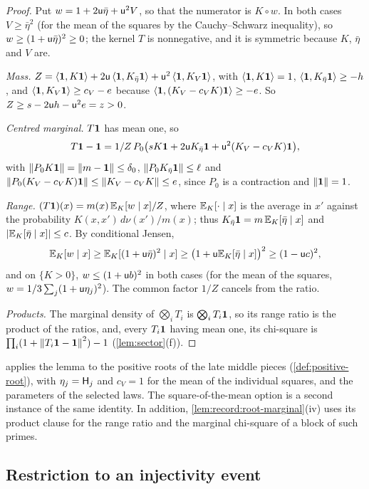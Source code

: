 \begin{proof}
Put $w=1+2\mathsf u\bar\eta+\mathsf u^2V$, so that the numerator is $K\circ w$. In both
cases $V\ge\bar\eta^2$ (for the mean of the squares by the Cauchy--Schwarz
inequality), so $w\ge(1+\mathsf u\bar\eta)^2\ge0$; the kernel $T$ is nonnegative,
and it is symmetric because $K$, $\bar\eta$ and $V$ are.

\emph{Mass.} $Z=\left\langle \mathbf 1,K\mathbf 1\right\rangle+2\mathsf u\left\langle \mathbf 1,K_{\bar\eta}\mathbf 1\right\rangle
+\mathsf u^2\left\langle \mathbf 1,K_V\mathbf 1\right\rangle$, with $\left\langle \mathbf 1,K\mathbf 1\right\rangle=1$,
$\left\langle \mathbf 1,K_{\bar\eta}\mathbf 1\right\rangle\ge-h$, and $\left\langle \mathbf 1,K_V\mathbf 1\right\rangle\ge c_V-e$ because
$\left\langle \mathbf 1,(K_V-c_VK)\mathbf 1\right\rangle\ge-e$. So $Z\ge s-2\mathsf u h-\mathsf u^2e=z>0$.

\emph{Centred marginal.} $T\mathbf 1$ has mean one, so
\[
  T\mathbf 1-\mathbf 1=1/Z\,P_0\big(sK\mathbf 1+2\mathsf u K_{\bar\eta}\mathbf 1
  +\mathsf u^2(K_V-c_VK)\mathbf 1\big),
\]
with $\left\|P_0K\mathbf 1\right\|=\left\|m-\mathbf 1\right\|\le\delta_0$, $\left\|P_0K_{\bar\eta}\mathbf 1\right\|\le\ell$
and $\left\|P_0(K_V-c_VK)\mathbf 1\right\|\le\left\|K_V-c_VK\right\|\le e$, since $P_0$ is a
contraction and $\left\|\mathbf 1\right\|=1$.

\emph{Range.} $(T\mathbf 1)(x)=m(x)\,\mathbb E_K[w\mid x]/Z$, where $\mathbb E_K[\cdot\mid x]$ is
the average in $x'$ against the probability $K(x,x')\,d\nu(x')/m(x)$; thus
$K_{\bar\eta}\mathbf 1=m\,\mathbb E_K[\bar\eta\mid x]$ and $|\mathbb E_K[\bar\eta\mid x]|\le c$. By
conditional Jensen,
\[
  \mathbb E_K[w\mid x]\ge\mathbb E_K[(1+\mathsf u\bar\eta)^2\mid x]
  \ge\big(1+\mathsf u\mathbb E_K[\bar\eta\mid x]\big)^2\ge(1-\mathsf u c)^2,
\]
and on $\{K>0\}$, $w\le(1+\mathsf u b)^2$ in both cases (for the mean of the
squares, $w=1/3\sum_j(1+\mathsf u\eta_j)^2$). The common factor $1/Z$ cancels
from the ratio.

\emph{Products.} The marginal density of $\bigotimes_iT_i$ is
$\bigotimes_iT_i\mathbf 1$, so its range ratio is the product of the ratios, and,
every $T_i\mathbf 1$ having mean one, its chi-square is
$\prod_i(1+\left\|T_i\mathbf 1-\mathbf 1\right\|^2)-1$ (\cref{lem:sector}(f)).
\end{proof}

 applies the lemma to the positive roots of the late
middle pieces (\cref{def:positive-root}), with $\eta_j=\mathsf H_{j}$ and
$c_V=1$ for the mean of the individual squares, and the parameters of the
selected laws. The square-of-the-mean option is a second instance of the same
identity. In addition,
\cref{lem:record:root-marginal}(iv) uses its product clause for the range ratio
and the marginal chi-square of a block of such primes.

\subsection{Restriction to an injectivity event}\label{subsec:cuts:restriction}

